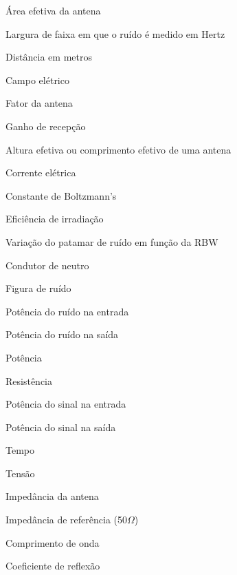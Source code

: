 
\begin{simbolos} \itemsep-1pt
	\item[$ Ae $] Área efetiva da antena
	\item[$ B $] Largura de faixa em que o ruído é medido em Hertz
	\item[$ d $] Distância em metros
	\item[$ E $] Campo elétrico
	\item[$ FA $] Fator da antena
	\item[$ Gr $] Ganho de recepção
	\item[$ h $] Altura efetiva ou comprimento efetivo de uma antena
	\item[$ I $] Corrente elétrica
	\item[$ k $] Constante de Boltzmann’s
	\item[$ K $] Eficiência de irradiação
	\item[$ M $] Variação do patamar de ruído em função da RBW
	\item[$ N $] Condutor de neutro
	\item[$ NF $] Figura de ruído
	\item[$ Ni $] Potência do ruído na entrada
	\item[$ No $] Potência do ruído na saída
	\item[$ P $] Potência
	\item[$ R $] Resistência
	\item[$ Si $] Potência do sinal na entrada
	\item[$ So $] Potência do sinal na saída
	\item[$ t $] Tempo
	\item[$ V $] Tensão
	\item[$ ZL  $] Impedância da antena
	\item[$ Zo $] Impedância de referência (50$\Omega$)
	\item[$ \lambda $] Comprimento de onda 
	\item[$ \Gamma $] Coeficiente de reflexão	
\end{simbolos}